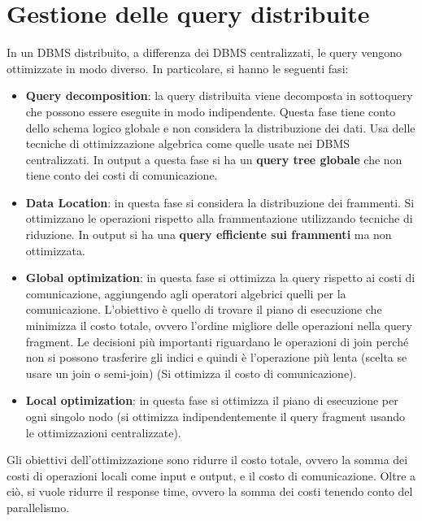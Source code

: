 \section{Gestione delle query distribuite}
In un DBMS distribuito, a differenza dei DBMS centralizzati, le query vengono ottimizzate
in modo diverso. In particolare, si hanno le seguenti fasi:
\begin{itemize}
    \item \textbf{Query decomposition}: la query distribuita viene decomposta in
          sottoquery che possono essere eseguite in modo indipendente. Questa
          fase tiene conto dello schema logico globale e non considera la
          distribuzione dei dati. Usa delle tecniche di ottimizzazione algebrica
          come quelle usate nei DBMS centralizzati.
          In output a questa fase si ha un \textbf{query tree globale} che non tiene
          conto dei costi di comunicazione.
    \item \textbf{Data Location}: in questa fase si considera la distribuzione
          dei frammenti. Si ottimizzano le operazioni rispetto alla
          frammentazione utilizzando tecniche di riduzione. In output si ha una
          \textbf{query efficiente sui frammenti} ma non ottimizzata.
    \item \textbf{Global optimization}: in questa fase si ottimizza la query
          rispetto ai costi di comunicazione, aggiungendo agli operatori
          algebrici quelli per la comunicazione. L'obiettivo è quello di
          trovare il piano di esecuzione che minimizza il costo totale, ovvero
          l'ordine migliore delle operazioni nella query fragment. Le
          decisioni più importanti riguardano le operazioni di join perché
          non si possono trasferire gli indici e quindi è l'operazione più lenta
          (scelta se usare un join o semi-join) (Si ottimizza il costo di comunicazione).
    \item \textbf{Local optimization}: in questa fase si ottimizza il piano di
          esecuzione per ogni singolo nodo (si ottimizza indipendentemente il query fragment
          usando le ottimizzazioni centralizzate).
\end{itemize}
Gli obiettivi dell'ottimizzazione sono ridurre il costo totale, ovvero la somma
dei costi di operazioni locali come input e output, e il costo di comunicazione.
Oltre a ciò, si vuole ridurre il response time, ovvero la somma dei costi tenendo
conto del parallelismo.


